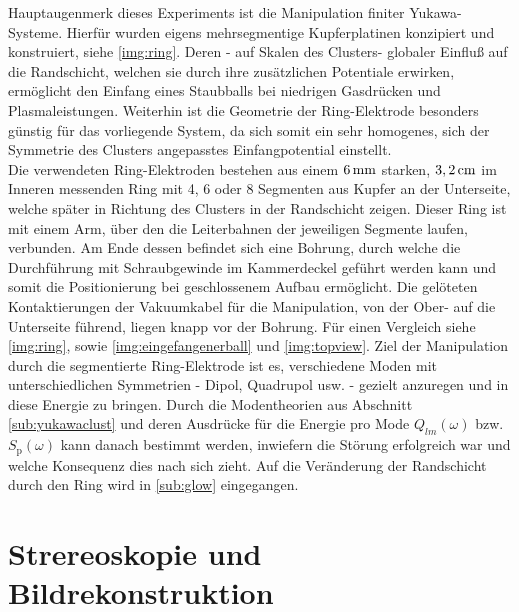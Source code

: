 \documentclass[numbers=noenddot,a4paper,notitlepage,twoside,BCOR15mm]{scrbook}
\newcommand{\ix}[1]{_\text{#1}}
\begin{document}
			Hauptaugenmerk dieses Experiments ist die Manipulation finiter Yukawa-Systeme. Hierf\"ur wurden eigens mehrsegmentige Kupferplatinen konzipiert und konstruiert, siehe \ref{img:ring}. Deren - auf Skalen des Clusters- globaler Einflu{\ss} auf die Randschicht, welchen sie durch ihre zusätzlichen Potentiale erwirken, erm\"oglicht den Einfang eines Staubballs bei niedrigen Gasdr\"ucken und Plasmaleistungen. Weiterhin ist die Geometrie der Ring-Elektrode besonders g\"unstig f\"ur das vorliegende System, da sich somit ein sehr homogenes, sich der Symmetrie des Clusters angepasstes Einfangpotential einstellt.\\
			Die verwendeten Ring-Elektroden bestehen aus einem $\unit[6]{mm}$ starken, $\unit[3,2]{cm}$ im Inneren messenden Ring mit 4, 6 oder 8 Segmenten aus Kupfer an der Unterseite, welche später in Richtung des Clusters in der Randschicht zeigen. Dieser Ring ist mit einem Arm, über den die Leiterbahnen der jeweiligen Segmente laufen, verbunden. Am Ende dessen befindet sich eine Bohrung, durch welche die Durchführung mit Schraubgewinde im Kammerdeckel geführt werden kann und somit die Positionierung bei geschlossenem Aufbau ermöglicht. Die gelöteten Kontaktierungen der Vakuumkabel für die Manipulation, von der Ober- auf die Unterseite führend, liegen knapp vor der Bohrung. Für einen Vergleich siehe \ref{img:ring}, sowie  \ref{img:eingefangenerball}  und \ref{img:topview}. Ziel der Manipulation durch die segmentierte Ring-Elektrode ist es, verschiedene Moden mit unterschiedlichen Symmetrien - Dipol, Quadrupol usw. - gezielt anzuregen und in diese Energie zu bringen. Durch die Modentheorien aus Abschnitt  \ref{sub:yukawaclust} und deren Ausdrücke für die Energie pro Mode $Q_{lm}\left(\omega\right)$ bzw. $S\ix{p}\left(\omega\right)$ kann danach bestimmt werden, inwiefern die Störung erfolgreich war und welche Konsequenz dies nach sich zieht. Auf die Veränderung der Randschicht durch den Ring wird in \ref{sub:glow} eingegangen.


		\section{Strereoskopie und Bildrekonstruktion}
\end{document}
